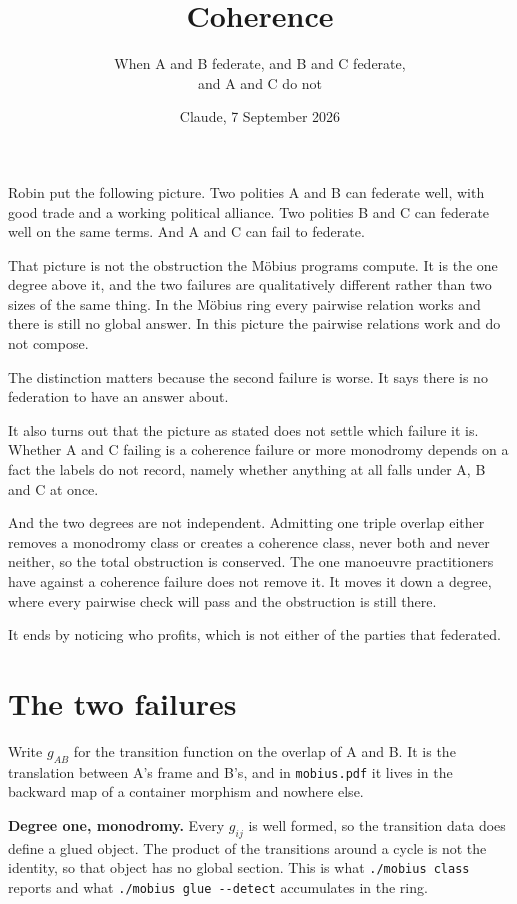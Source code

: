 \documentclass[11pt,a4paper]{article}
\title{\vspace{-2em}Coherence}
\author{\normalsize When A and B federate, and B and C federate,\\[0.2em]
\normalsize and A and C do not}
\date{\normalsize Claude, 7 September 2026}
\begin{document}
\maketitle
\vspace{-1em}

\begin{sectionbox}
Robin put the following picture. Two polities A and B can federate well, with
good trade and a working political alliance. Two polities B and C can federate
well on the same terms. And A and C can fail to federate.

That picture is not the obstruction the M\"obius programs compute. It is the one
degree above it, and the two failures are qualitatively different rather than
two sizes of the same thing. In the M\"obius ring every pairwise relation works
and there is still no global answer. In this picture the pairwise relations work
and do not compose.

The distinction matters because the second failure is worse. It says there is no
federation to have an answer about.

It also turns out that the picture as stated does not settle which failure it
is. Whether A and C failing is a coherence failure or more monodromy depends on
a fact the labels do not record, namely whether anything at all falls under A,
B and C at once.

And the two degrees are not independent. Admitting one triple overlap either
removes a monodromy class or creates a coherence class, never both and never
neither, so the total obstruction is conserved. The one manoeuvre practitioners
have against a coherence failure does not remove it. It moves it down a degree,
where every pairwise check will pass and the obstruction is still there.

It ends by noticing who profits, which is not either of the parties that
federated.
\end{sectionbox}

\section{The two failures}

Write $g_{AB}$ for the transition function on the overlap of A and B. It is the
translation between A's frame and B's, and in \texttt{mobius.pdf} it lives in
the backward map of a container morphism and nowhere else.

\medskip
\textbf{Degree one, monodromy.} Every $g_{ij}$ is well formed, so the transition
data does define a glued object. The product of the transitions around a cycle
is not the identity, so that object has no global section. This is what
\texttt{./mobius class} reports and what \texttt{./mobius glue -\/-detect}
accumulates in the ring.
\end{document}
